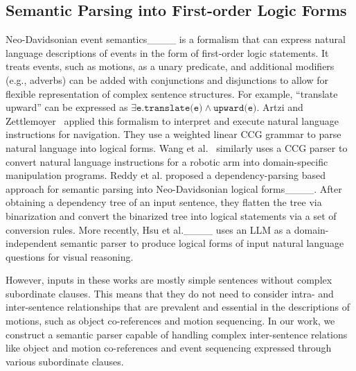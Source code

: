 \subsection{Semantic Parsing into First-order Logic Forms}
Neo-Davidsonian event semantics____ is a formalism that can express natural language descriptions of events in the form of first-order logic statements.
It treats events, such as motions, as a unary predicate, and additional modifiers (e.g., adverbs) can be added with conjunctions and disjunctions to allow for flexible representation of complex sentence structures.
For example, ``translate upward'' can be expressed as $\exists \texttt{e.} \texttt{translate(e)} \land \texttt{upward(e)}$.
Artzi and Zettlemoyer~ applied this formalism to interpret and execute natural language instructions for navigation.
They use a weighted linear CCG grammar to parse natural language into logical forms. 
Wang et al.~ similarly uses a CCG parser to convert natural language instructions for a robotic arm into domain-specific manipulation programs.
Reddy et al. proposed a dependency-parsing based approach for semantic parsing into Neo-Davidsonian logical forms____.
After obtaining a dependency tree of an input sentence, they flatten the tree via binarization and convert the binarized tree into logical statements via a set of conversion rules.
More recently, Hsu et al.____ uses an LLM as a domain-independent semantic parser to produce logical forms of input natural language questions for visual reasoning.

However, inputs in these works are mostly simple sentences without complex subordinate clauses.
This means that they do not need to consider intra- and inter-sentence relationships that are prevalent and essential in the descriptions of motions, such as object co-references and motion sequencing.
%
In our work, we construct a semantic parser capable of handling complex inter-sentence relations like object and motion co-references and event sequencing expressed through various subordinate clauses.


